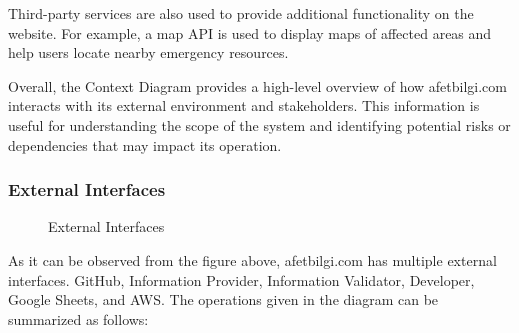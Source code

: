 \documentclass[a4paper]{article}
\begin{document}
        Third-party services are also used to provide additional functionality on the website. For example, a map API is used to
        display maps of affected areas and help users locate nearby emergency resources.

        Overall, the Context Diagram provides a high-level overview of how afetbilgi.com interacts with its external environment and
        stakeholders. This information is useful for understanding the scope of the system and identifying potential risks or
        dependencies that may impact its operation.

    \subsubsection{External Interfaces}
    \begin{figure}
    
    \caption{External Interfaces}
    \end{figure}

    As it can be observed from the figure above, afetbilgi.com has multiple external interfaces. GitHub, Information Provider,
    Information Validator, Developer, Google Sheets, and AWS.
    The operations given in the diagram can be summarized as follows:
\end{document}

